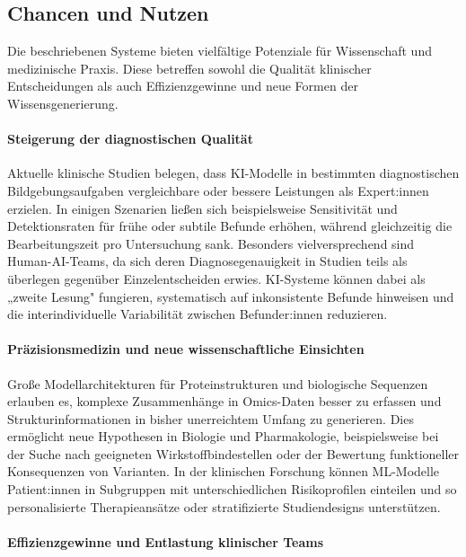 \documentclass[lettersize,journal]{IEEEtran}
\begin{document}
	
	
\subsection{Chancen und Nutzen}
\label{subsec:chancen_nutzen}

Die beschriebenen Systeme bieten vielfältige Potenziale für Wissenschaft und medizinische Praxis. Diese betreffen sowohl die Qualität klinischer Entscheidungen als auch Effizienzgewinne und neue Formen der Wissensgenerierung.

\paragraph{Steigerung der diagnostischen Qualität}

Aktuelle klinische Studien belegen, dass KI-Modelle in bestimmten diagnostischen Bildgebungsaufgaben vergleichbare oder bessere Leistungen als Expert:innen erzielen\cite{ref:hai2025aiindex}\cite{ref:faiyazuddin2025}. In einigen Szenarien ließen sich beispielsweise Sensitivität und Detektionsraten für frühe oder subtile Befunde erhöhen, während gleichzeitig die Bearbeitungszeit pro Untersuchung sank\cite{ref:faiyazuddin2025}. Besonders vielversprechend sind Human-AI-Teams, da sich deren Diagnosegenauigkeit in Studien teils als überlegen gegenüber Einzelentscheiden erwies\cite{ref:hai2025aiindex}. KI-Systeme können dabei als „zweite Lesung" fungieren, systematisch auf inkonsistente Befunde hinweisen und die interindividuelle Variabilität zwischen Befunder:innen reduzieren.

\paragraph{Präzisionsmedizin und neue wissenschaftliche Einsichten}

Große Modellarchitekturen für Proteinstrukturen und biologische Sequenzen erlauben es, komplexe Zusammenhänge in Omics-Daten besser zu erfassen und Strukturinformationen in bisher unerreichtem Umfang zu generieren\cite{ref:hai2025aiindex}. Dies ermöglicht neue Hypothesen in Biologie und Pharmakologie, beispielsweise bei der Suche nach geeigneten Wirkstoffbindestellen oder der Bewertung funktioneller Konsequenzen von Varianten. In der klinischen Forschung können ML-Modelle Patient:innen in Subgruppen mit unterschiedlichen Risikoprofilen einteilen und so personalisierte Therapieansätze oder stratifizierte Studiendesigns unterstützen.

\paragraph{Effizienzgewinne und Entlastung klinischer Teams}
\end{document}
